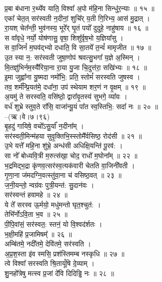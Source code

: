 प्र॒बा ब॑धाना र॒थ्ये᳚व याति॒ विश्वा᳚ अ॒पो म॑हि॒ना सिन्धु॑र॒न्याः ॥ १५ ॥\\
एका᳚ चेत॒त् सर॑स्वती न॒दीनां॒ शुचि᳚र् य॒ती गि॒रिभ्य॒ आस॑ मु॒द्रात् ।\\
रा॒यश् चेत᳚न्ती॒ भुव॑नस्य॒ भूरे᳚र् घृ॒तं पयो᳚ दुदुहे॒ नाहु॑षाय ॥ १६ ॥\\
स वा᳚वृधे॒ नर्यो॒ योष॑णासु॒ वृषा॒ शिशु᳚र्वृष॒भो य॒ज्ञिया᳚सु ।\\
स वा॒जिनं᳚ म॒घव॑द्भ्यो दधाति॒ वि सा॒तये᳚ त॒न्वं᳚ मामृजीत ॥ १७ ॥\\
उ॒त स्या न॒: सर॑स्वती जुषा॒णोप॑ श्रवत्सु॒भगा᳚ य॒ज्ञे अ॒स्मिन् ।\\
मि॒तज्ञु॑भिर्नम॒स्यै᳚रिया॒ना रा॒या यु॒जा चि॒दुत्त॑रा॒ सखि॑भ्यः ॥ १८ ॥\\
इ॒मा जुह्वा᳚ना यु॒ष्मदा नमो᳚भि॒: प्रति॒ स्तोमं᳚ सरस्वति जुषस्व ।\\
तव॒ शर्म᳚न्प्रि॒यत॑मे॒ दधा᳚ना॒ उप॑ स्थेयाम शर॒णं न वृ॒क्षम् ॥ १९ ॥\\
अ॒यमु॑ ते सरस्वति॒ वसि॑ष्ठो॒ द्वारा᳚वृ॒तस्य॑ सुभगे॒ व्या᳚वः ।\\
वर्ध॑ शुभ्रे स्तुव॒ते रा᳚सि॒ वाजा॑न्यू॒यं पा᳚त स्व॒स्तिभि॒: सदा᳚ नः ॥ २० ॥\\
–(ऋ।वे।७।९६)\\
बृ॒हदु॑ गायिषे॒ वचो᳚ऽसु॒र्या᳚ न॒दीना᳚म् ।\\
सर॑स्वती॒मिन्म॑हया सुवृ॒क्तिभि॒स्स्तोमै᳚र्वसिष्ठ॒ रोद॑सी ॥ २१ ॥\\
उ॒भे यत्ते᳚ महि॒ना शु॑भ्रे॒ अन्ध॑सी अधिक्षि॒यन्ति॑ पू॒रव॑: ।\\
सा नो᳚ बोध्यवि॒त्री म॒रुत्स॑खा॒ चोद॒ राधो᳚ म॒घोना᳚म् ॥ २२ ॥\\
भ॒द्रमिद्भ॒द्रा कृ॑णव॒त्सर॑स्व॒त्यक॑वारी चेतति वा॒जिनी᳚वती ।\\
गृ॒णा॒ना ज॑मदग्नि॒वत्स्तु॑वा॒ना च॑ वसिष्ठ॒वत् ॥ २३ ॥\\
ज॒नी॒यन्तो॒ न्वग्र॑वः पुत्री॒यन्त॑: सु॒दान॑वः ।\\
सर॑स्वन्तं हवामहे ॥ २४ ॥\\
ये ते᳚ सरस्व ऊ॒र्मयो॒ मधु॑मन्तो घृत॒श्चुत॑: ।\\
तेभि᳚र्नोऽवि॒ता भ॒व ॥ २५ ॥\\
पी॒पि॒वांसं॒ सर॑स्वत॒: स्तनं॒ यो वि॒श्वद॑र्शतः ।\\
भ॒क्षी॒महि॑ प्र॒जामिषम्᳚ ॥ २६ ॥\\
अम्बि॑तमे॒ नदी᳚तमे॒ देवि॑तमे॒ सर॑स्वति ।\\
अ॒प्र॒श॒स्ता इ॑व स्मसि॒ प्रश॑स्तिमम्ब नस्कृधि ॥ २७ ॥\\
त्वे विश्वा᳚ सरस्वति श्रि॒तायूं᳚षि दे॒व्याम् ।\\
शु॒नहो᳚त्रेषु मत्स्व प्र॒जां दे᳚वि दिदिड्ढि नः ॥ २८ ॥\\
